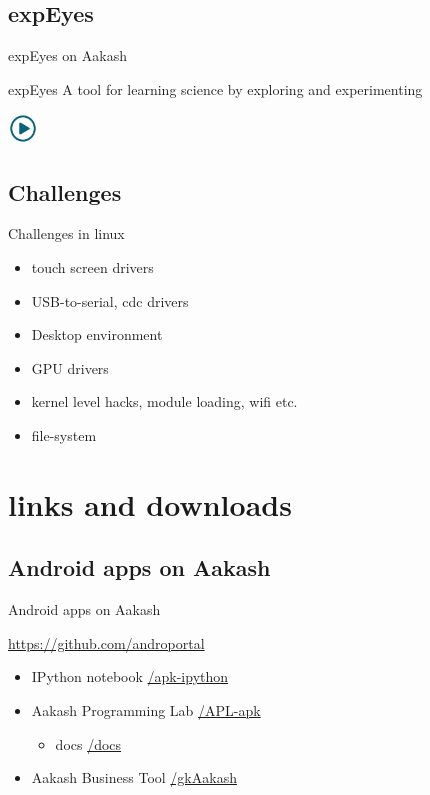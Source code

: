\documentclass{beamer}
\begin{document}
\subsection{expEyes}
\begin{frame}{expEyes on Aakash}
  \begin{block}{expEyes}
    A tool for learning science by exploring and experimenting
  \end{block}
   \centerline{\href{file:///opt/techfest2013/expEyes.3gp}{\includegraphics[height=0.8cm,width=0.8cm]{play.jpg}}}
\end{frame}

\subsection{Challenges}
\begin{frame}{Challenges in linux}
  \begin{block}{}
    \begin{itemize}
        \item touch screen drivers
        \item USB-to-serial, cdc drivers
        \item Desktop environment
        \item GPU drivers
        \item kernel level hacks, module loading, wifi etc.
        \item file-system
    \end{itemize}
  \end{block}
\end{frame}

\section{links and downloads}
\subsection{Android apps on Aakash}
\begin{frame}{Android apps on Aakash}
  \begin{block}{\url{https://github.com/androportal}}
    \begin{itemize}
      \item IPython notebook \hfill \url{/apk-ipython}
      \item Aakash Programming Lab \hfill \url{/APL-apk}
        \begin{itemize}
        \item docs \hfill \url{/docs}
        \end{itemize}
      \item Aakash Business Tool \hfill \url{/gkAakash}
    \end{itemize}
  \end{block}
\end{frame}
\end{document}
